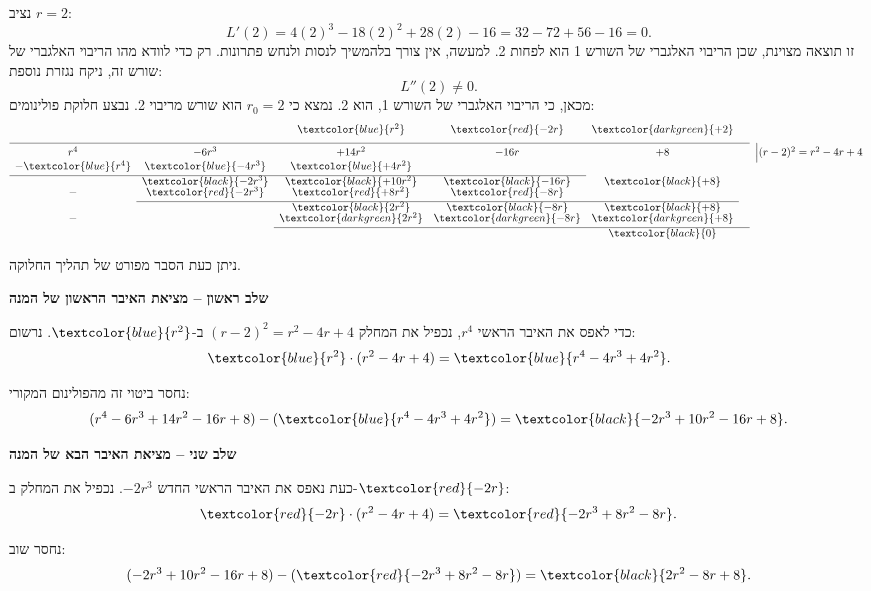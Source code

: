 \documentclass{article}
\numberwithin{equation}{section}
\begin{document}
נציב $r=2$:
\[
L'(2) = 4(2)^3 - 18(2)^2 + 28(2) - 16 = 32 - 72 + 56 - 16 = 0.
\]
זו תוצאה מצוינת, שכן הריבוי האלגברי של השורש 1 הוא לפחות 2. למעשה, אין צורך בלהמשיך לנסות ולנחש פתרונות. רק כדי לוודא מהו הריבוי האלגברי של שורש זה, ניקח נגזרת נוספת:
\[
L''(2)\neq0.
\]
מכאן, כי הריבוי האלגברי של השורש 1, הוא 2.
נמצא כי $r_0 = 2$ הוא שורש מריבוי 2.  
נבצע חלוקת פולינומים:
\[
\begin{array}{c c c c c c c l}
 & &  \textcolor{blue}{r^{2}}   & \textcolor{red}{-2r}   & \textcolor{darkgreen}{+2}  \\[6pt]
\cline{1-6}
 r^4 & -6r^3 & +14r^2 & -16r & +8 &  &  \Big|(r - 2)^2 = r^2 - 4r + 4\\[-2pt]
- \textcolor{blue}{r^4} & \textcolor{blue}{-4r^3} & \textcolor{blue}{+4r^2} &  &  &  &  \\[2pt]
\cline{1-4}
  &   \textcolor{black}{-2r^3} & \textcolor{black}{+10r^2} & \textcolor{black}{-16r} & \textcolor{black}{+8}  &  \\[-2pt]
-  &  \textcolor{red}{-2r^3} & \textcolor{red}{+8r^2} & \textcolor{red}{-8r} &  &  \\[2pt]
\cline{2-5}
  &  &  \textcolor{black}{2r^2} & \textcolor{black}{-8r} & \textcolor{black}{+8}  &  \\[-2pt]
-  &  &  \textcolor{darkgreen}{2r^2} & \textcolor{darkgreen}{-8r} & \textcolor{darkgreen}{+8}  &  \\[2pt]
\cline{3-6}
  &  &  &  &  \textcolor{black}{0}
\end{array}
\]



ניתן כעת הסבר מפורט של תהליך החלוקה.  

\textbf{שלב ראשון – מציאת האיבר הראשון של המנה} 

כדי לאפס את האיבר הראשי $r^4$, נכפיל את המחלק $(r-2)^2 = r^2 - 4r + 4$ ב-\(\textcolor{blue}{r^2}\).  
נרשום:
\[
\textcolor{blue}{r^2} \cdot (r^2 - 4r + 4) = 
\textcolor{blue}{r^4 - 4r^3 + 4r^2}.
\]

נחסר ביטוי זה מהפולינום המקורי:
\[
(r^4 - 6r^3 + 14r^2 - 16r + 8)
- (\textcolor{blue}{r^4 - 4r^3 + 4r^2})
= \textcolor{black}{-2r^3 + 10r^2 - 16r + 8}.
\]

\textbf{שלב שני – מציאת האיבר הבא של המנה} 

כעת נאפס את האיבר הראשי החדש $-2r^3$.  
נכפיל את המחלק ב-\(\textcolor{red}{-2r}\):
\[
\textcolor{red}{-2r} \cdot (r^2 - 4r + 4)
= \textcolor{red}{-2r^3 + 8r^2 - 8r}.
\]

נחסר שוב:
\[
(-2r^3 + 10r^2 - 16r + 8)
- (\textcolor{red}{-2r^3 + 8r^2 - 8r})
= \textcolor{black}{2r^2 - 8r + 8}.
\]
\end{document}
